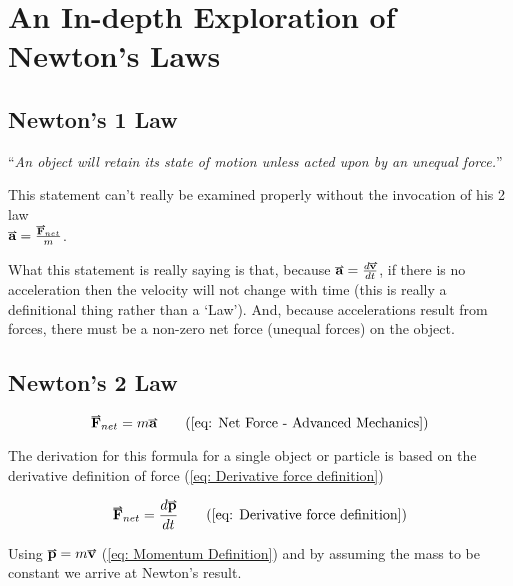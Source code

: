 \documentclass[main.tex]{subfiles}
\begin{document}
        \newpage

        \section{An In-depth Exploration of Newton's Laws}

            \subsection{Newton's 1 Law}

                ``\textit{An object will retain its state of motion unless acted upon by an unequal force.}''

                This statement can't really be examined properly without the invocation of his 2 law\\$\vect{a} = \frac{\vect{F}_{net}}{m}$.

                What this statement is really saying is that, because $\vect{a} = \frac{d\vect{v}}{dt}$, if there is no acceleration then the velocity will not change with time (this is really a definitional thing rather than a `Law'). And, because accelerations result from forces, there must be a non-zero net force (unequal forces) on the object.

            \subsection{Newton's 2 Law}

                \begin{equation*}
                    \vect{F}_{net} = m\vect{a}
                    \tag{\eqnum{eq: Net Force - Advanced Mechanics}}
                \end{equation*}

                The derivation for this formula for a single object or particle is based on the derivative definition of force (\eqref{eq: Derivative force definition})

                \begin{equation*}
                    \vect{F}_{net} = \frac{d\vect{p}}{dt}
                    \tag{\eqnum{eq: Derivative force definition}}
                \end{equation*}

                Using $\vect{p} = m\vect{v}$ (\eqref{eq: Momentum Definition}) and by assuming the mass to be constant we arrive at Newton's result.
\end{document}

